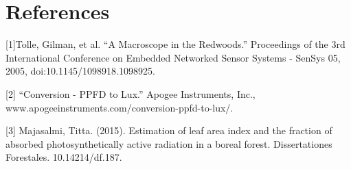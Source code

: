 \documentclass[twocolumn,11pt]{asme2ej}
\begin{document}

\section{References}

[1]Tolle, Gilman, et al. “A Macroscope in the Redwoods.” Proceedings of the 3rd International Conference on Embedded Networked Sensor Systems - SenSys 05, 2005, doi:10.1145/1098918.1098925.

[2] “Conversion - PPFD to Lux.” Apogee Instruments, Inc., www.apogeeinstruments.com/conversion-ppfd-to-lux/.

[3] Majasalmi, Titta. (2015). Estimation of leaf area index and the fraction of absorbed photosynthetically active radiation in a boreal forest. Dissertationes Forestales. 10.14214/df.187.
\end{document}
